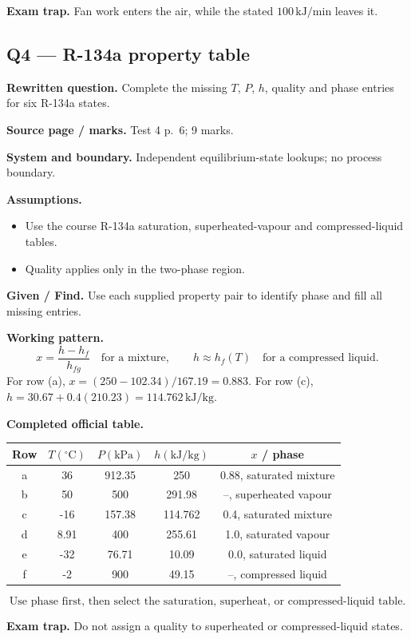 \textbf{Exam trap.} Fan work enters the air, while the stated $100\,\mathrm{kJ/min}$ leaves it.

\subsection*{Q4 --- R-134a property table}
\textbf{Rewritten question.} Complete the missing $T$, $P$, $h$, quality and phase entries for six R-134a states.

\textbf{Source page / marks.} Test 4 p.~6; 9 marks.

\textbf{System and boundary.} Independent equilibrium-state lookups; no process boundary.

\textbf{Assumptions.}
\begin{itemize}
  \item Use the course R-134a saturation, superheated-vapour and compressed-liquid tables.
  \item Quality applies only in the two-phase region.
\end{itemize}

\textbf{Given / Find.} Use each supplied property pair to identify phase and fill all missing entries.

\textbf{Working pattern.}
\[
x=\frac{h-h_f}{h_{fg}}\quad\text{for a mixture},\qquad h\approx h_f(T)\quad\text{for a compressed liquid.}
\]
For row (a), $x=(250-102.34)/167.19=0.883$. For row (c), $h=30.67+0.4(210.23)=114.762\,\mathrm{kJ/kg}$.

\textbf{Completed official table.}
\begin{center}
\small
\begin{tabular}{ccccc}
\toprule
Row & $T(^\circ\mathrm{C})$ & $P(\mathrm{kPa})$ & $h(\mathrm{kJ/kg})$ & $x$ / phase\\
\midrule
a & 36 & 912.35 & 250 & 0.88, saturated mixture\\
b & 50 & 500 & 291.98 & --, superheated vapour\\
c & -16 & 157.38 & 114.762 & 0.4, saturated mixture\\
d & 8.91 & 400 & 255.61 & 1.0, saturated vapour\\
e & -32 & 76.71 & 10.09 & 0.0, saturated liquid\\
f & -2 & 900 & 49.15 & --, compressed liquid\\
\bottomrule
\end{tabular}
\end{center}
\[
\boxed{\text{Use phase first, then select the saturation, superheat, or compressed-liquid table.}}
\]

\textbf{Exam trap.} Do not assign a quality to superheated or compressed-liquid states.
